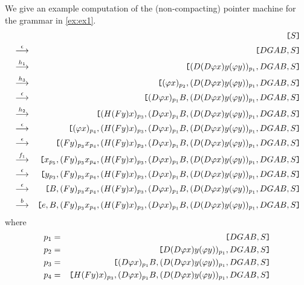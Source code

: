 \begin{example} We give an example computation of the (non-compacting) pointer
machine for the grammar in \ref{ex:ex1}.
\begin{eqnarray}
\nonumber & & \hbox{\tt [} S \hbox{\tt ]}  \\
\nonumber & \stackrel{{\epsilon}}{\longrightarrow} & \hbox{\tt [} DGAB, S \hbox{\tt ]}  \\
\nonumber & \stackrel{{h_1}}{\longrightarrow} & \hbox{\tt [} (D(D\varphi x) y (\varphi y))_{p_1}, DGAB, S \hbox{\tt ]} \\
\nonumber & \stackrel{{h_3}}{\longrightarrow} & \hbox{\tt [} (\varphi x)_{p_2},(D(D\varphi x) y (\varphi y))_{p_1}, DGAB, S \hbox{\tt ]} \\
\nonumber & \stackrel{{\epsilon}}{\longrightarrow} & \hbox{\tt [} (D \varphi x)_{p_1} B,(D(D\varphi x) y (\varphi y))_{p_1}, DGAB, S \hbox{\tt ]} \\
\nonumber & \stackrel{{h_2}}{\longrightarrow} & \hbox{\tt [} (H(Fy)x)_{p_3},(D \varphi x)_{p_1} B,(D(D\varphi x) y (\varphi y))_{p_1}, DGAB, S \hbox{\tt ]} \\
\nonumber & \stackrel{{\epsilon}}{\longrightarrow} & \hbox{\tt [} (\varphi x)_{p_4},(H(Fy)x)_{p_3},(D \varphi x)_{p_1} B,(D(D\varphi x) y (\varphi y))_{p_1}, DGAB, S \hbox{\tt ]} \\
\nonumber & \stackrel{{\epsilon}}{\longrightarrow} & \hbox{\tt [} (Fy)_{p_3} x_{p_4},(H(Fy)x)_{p_3},(D \varphi x)_{p_1} B,(D(D\varphi x) y (\varphi y))_{p_1}, DGAB, S \hbox{\tt ]} \\
\nonumber & \stackrel{{f_1}}{\longrightarrow} & \hbox{\tt [} x_{p_5},(Fy)_{p_3} x_{p_4},(H(Fy)x)_{p_3},(D \varphi x)_{p_1} B,(D(D\varphi x) y (\varphi y))_{p_1}, DGAB, S \hbox{\tt ]} \\
\nonumber & \stackrel{{\epsilon}}{\longrightarrow} & \hbox{\tt [} y_{p_3},(Fy)_{p_3} x_{p_4},(H(Fy)x)_{p_3},(D \varphi x)_{p_1} B,(D(D\varphi x) y (\varphi y))_{p_1}, DGAB, S \hbox{\tt ]} \\
\nonumber & \stackrel{{\epsilon}}{\longrightarrow} & \hbox{\tt [} B,(Fy)_{p_3} x_{p_4},(H(Fy)x)_{p_3},(D \varphi x)_{p_1} B,(D(D\varphi x) y (\varphi y))_{p_1}, DGAB, S \hbox{\tt ]} \\
\nonumber & \stackrel{{b}}{\longrightarrow} & \hbox{\tt [} e,B,(Fy)_{p_3} x_{p_4},(H(Fy)x)_{p_3},(D \varphi x)_{p_1} B,(D(D\varphi x) y (\varphi y))_{p_1}, DGAB, S \hbox{\tt ]}
\end{eqnarray}
where
\begin{eqnarray}
\nonumber p_1 & = & \stackl DGAB, S \stackr \\
\nonumber p_2 & = & \stackl D(D\varphi x) y (\varphi y))_{p_1}, DGAB, S \stackr \\
\nonumber p_3 & = & \stackl (D \varphi x)_{p_1} B,(D(D\varphi x) y (\varphi y))_{p_1}, DGAB, S \stackr \\
\nonumber p_4 & = & \stackl H(Fy)x)_{p_3},(D \varphi x)_{p_1} B,(D(D\varphi x) y (\varphi y))_{p_1}, DGAB, S \stackr \\

\end{eqnarray}
\end{example}
